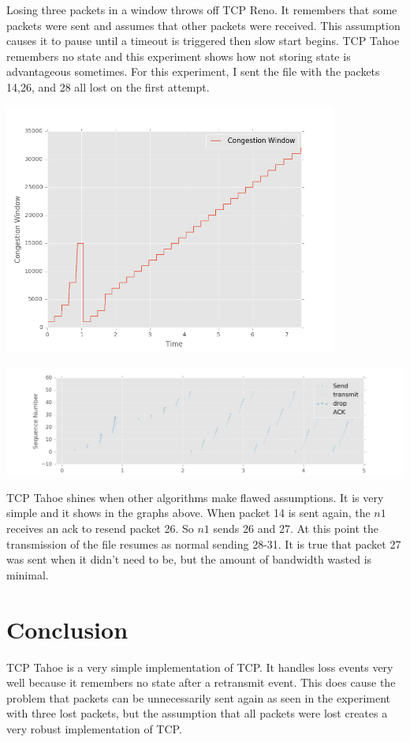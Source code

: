 \documentclass[fleqn,11pt]{article}
\begin{document}
Losing three packets in a window throws off TCP Reno. 
It remembers that some packets were sent and assumes that other packets were received.
This assumption causes it to pause until a timeout is triggered then slow start begins.
TCP Tahoe remembers no state and this experiment shows how not storing state is advantageous sometimes.
For this experiment, I sent the file with the packets 14,26, and 28 all lost on the first attempt.

\includegraphics[width=11cm]{graphs/cwnd142628.png}

\includegraphics[width=16cm]{graphs/sequence142628.png}

TCP Tahoe shines when other algorithms make flawed assumptions. 
It is very simple and it shows in the graphs above. 
When packet 14 is sent again, the $n1$ receives an ack to resend packet 26. So $n1$ sends 26 and 27.
At this point the transmission of the file resumes as normal sending 28-31.
It is true that packet 27 was sent when it didn't need to be, but the amount of bandwidth wasted is minimal.


\section{Conclusion}

TCP Tahoe is a very simple implementation of TCP. 
It handles loss events very well because it remembers no state after a retransmit event.
This does cause the problem that packets can be unnecessarily sent again as seen in the experiment with three lost packets,
but the assumption that all packets were lost creates a very robust implementation of TCP.
\end{document}
